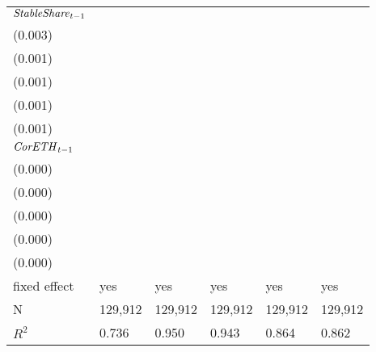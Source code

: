 \begin{tabular}{llllll}
${{\it StableShare}}_{t-1}$  &   \makecell{$0.100^{***}$ \\ (0.003)} &  \makecell{$-0.007^{***}$ \\ (0.001)} &  \makecell{$-0.006^{***}$ \\ (0.001)} &  \makecell{$0.023^{***}$ \\ (0.001)} &   \makecell{$0.016^{***}$ \\ (0.001)} \\
${{\it CorETH}}_{t-1}$       &  \makecell{$-0.001^{***}$ \\ (0.000)} &     \makecell{$-0.000^{}$ \\ (0.000)} &     \makecell{$-0.000^{}$ \\ (0.000)} &     \makecell{$0.000^{}$ \\ (0.000)} &  \makecell{$-0.000^{***}$ \\ (0.000)} \\
\midrule fixed effect        &                                   yes &                                   yes &                                   yes &                                  yes &                                   yes \\
N                            &                               129,912 &                               129,912 &                               129,912 &                              129,912 &                               129,912 \\
$R^2$                        &                                 0.736 &                                 0.950 &                                 0.943 &                                0.864 &                                 0.862 \\
\bottomrule
\end{tabular}
